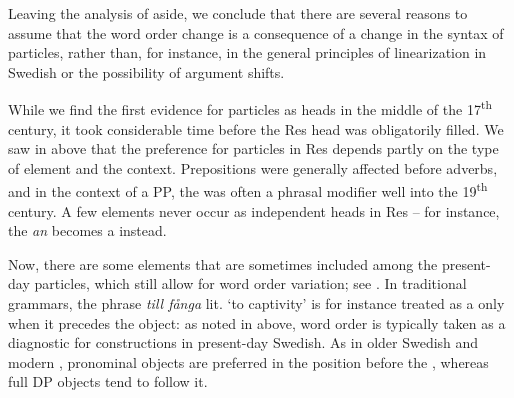 \documentclass[output=paper]{langscibook}
\begin{document}
\ea\label{ex:lalu:61}

\z
\ex\label{ex:lalu:62}
\z
\z


Leaving the analysis of   aside, we conclude that there are several reasons to assume that the word order change is a consequence of a change in the syntax of particles, rather than, for instance, in the general principles of linearization in Swedish or the possibility of argument shifts. 



While we find the first evidence for particles as heads in the middle of the 17\textsuperscript{th} century, it took considerable time before the Res head was obligatorily filled. We saw in  above that the preference for particles in Res depends partly on the type of element and the context. Prepositions were generally affected before adverbs, and in the context of a PP, the  was often a phrasal modifier well into the 19\textsuperscript{th} century. A few elements never occur as independent  heads in Res – for instance, the  \textit{an} becomes a  instead.



Now, there are some elements that are sometimes included among the present-day particles, which still allow for word order variation; see . In traditional grammars, the phrase \textit{till fånga} lit. ‘to captivity’ is for instance treated as a  only when it precedes the object: as noted in  above, word order is typically taken as a diagnostic for  constructions in present-day Swedish. As in older Swedish and modern , pronominal objects are preferred in the position before the , whereas full DP objects tend to follow it.
\end{document}
